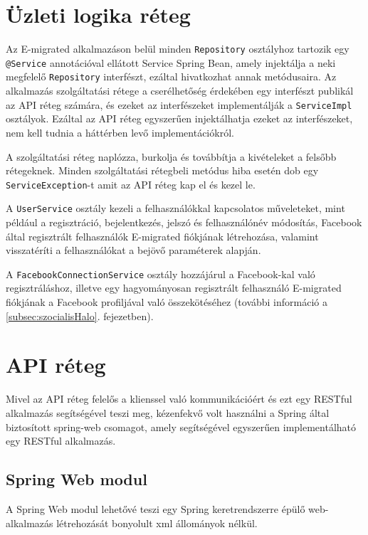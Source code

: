 \section{Üzleti logika réteg}
\label{subsec:szolgaltatas}
Az E-migrated alkalmazáson belül minden \texttt{Repository} osztályhoz tartozik egy \texttt{@Service} annotációval ellátott Service Spring Bean, amely injektálja a neki megfelelő \texttt{Repository} interfészt, ezáltal hivatkozhat annak metódusaira. Az alkalmazás szolgáltatási rétege a cserélhetőség érdekében egy interfészt publikál az API réteg számára, és ezeket az interfészeket implementálják a \texttt{ServiceImpl} osztályok. Ezáltal az API réteg egyszerűen injektálhatja ezeket az interfészeket, nem kell tudnia a háttérben levő implementációkról. 

A szolgáltatási réteg naplózza, burkolja és továbbítja a kivételeket a felsőbb rétegeknek. Minden szolgáltatási rétegbeli metódus hiba esetén dob egy \texttt{ServiceException}-t amit az API réteg kap el és kezel le.

A \texttt{UserService} osztály kezeli a felhasználókkal kapcsolatos műveleteket, mint például a regisztráció, bejelentkezés, jelszó és felhasználónév módosítás, Facebook által regisztrált felhasználók E-migrated fiókjának létrehozása, valamint visszatéríti a felhasználókat a bejövő paraméterek alapján. 

A \texttt{FacebookConnectionService} osztály hozzájárul a Facebook-kal való regisztráláshoz, illetve egy hagyományosan regisztrált felhasználó E-migrated fiókjának a Facebook profiljával való összekötéséhez (további információ a  \ref{subsec:szocialisHalo}. fejezetben).


\section{API réteg}
\label{subsec:API}

Mivel az API réteg felelős a klienssel való kommunikációért és ezt egy RESTful alkalmazás segítségével teszi meg, kézenfekvő volt használni a Spring által biztosított spring-web csomagot, amely segítségével egyszerűen implementálható egy RESTful alkalmazás. 

\subsection{Spring Web modul}\label{subsubsec:SpringWeb}
A Spring Web modul lehetővé teszi egy Spring keretrendszerre épülő web-alkalmazás létrehozását bonyolult xml állományok nélkül. 

